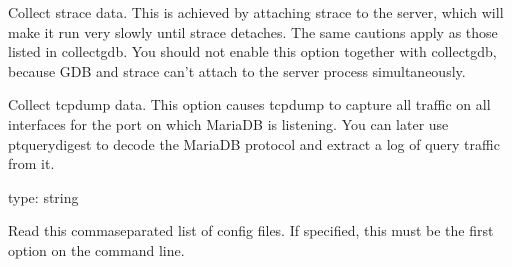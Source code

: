 \documentclass[letterpaper,10pt,english]{sphinxmanual}
\begin{document}
\begin{fulllineitems}
\label{\detokenize{mariadb-stat:cmdoption-mariadb-stat-collect-strace}}
\sphinxAtStartPar
Collect strace data. This is achieved by attaching strace to the server, which
will make it run very slowly until strace detaches.  The same cautions apply as
those listed in \textendash{}collect\sphinxhyphen{}gdb.  You should not enable this option together with
\textendash{}collect\sphinxhyphen{}gdb, because GDB and strace can’t attach to the server process
simultaneously.

\end{fulllineitems}


\begin{fulllineitems}
\label{\detokenize{mariadb-stat:cmdoption-mariadb-stat-collect-tcpdump}}
\sphinxAtStartPar
Collect tcpdump data. This option causes tcpdump to capture all traffic on all
interfaces for the port on which MariaDB is listening.  You can later use
pt\sphinxhyphen{}query\sphinxhyphen{}digest to decode the MariaDB protocol and extract a log of query traffic
from it.

\end{fulllineitems}


\begin{fulllineitems}
\label{\detokenize{mariadb-stat:cmdoption-mariadb-stat-config}}
\sphinxAtStartPar
type: string

\sphinxAtStartPar
Read this comma\sphinxhyphen{}separated list of config files.  If specified, this must be the
first option on the command line.

\end{fulllineitems}
\end{document}
